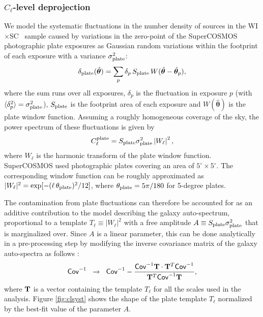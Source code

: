 \documentclass[useAMS,usenatbib]{mn2e}
\newcommand{\nv}{\hat{\boldsymbol{\theta}}}
\newcommand{\wisc}{WI$\times$SC}
\begin{document}
    \subsubsection{$C_\ell$-level deprojection}\label{sssec:methods.syst.plates}
      We model the systematic fluctuations in the number density of sources in the \wisc~ sample caused by variations in the zero-point of the SuperCOSMOS photographic plate exposures as Gaussian random variations within the footprint of each exposure with a variance $\sigma^2_{\rm plate}$:
      \begin{equation}
        \delta_{\rm plate}(\nv) = \sum_p \delta_p\,S_{\rm plate}\,W(\nv-\nv_p),
      \end{equation}
      where the sum runs over all exposures, $\delta_p$ is the fluctuation in exposure $p$ (with $\langle\delta_p^2\rangle=\sigma^2_{\rm plate}$), $S_{\rm plate}$ is the footprint area of each exposure and $W(\nv)$ is the plate window function. Assuming a roughly homogeneous coverage of the sky, the power spectrum of these fluctuations is given by
      \begin{equation}
        C_\ell^{\rm plate}=S_{\rm plate}\sigma_{\rm plate}^2\left|W_\ell\right|^2,
      \end{equation}
      where $W_\ell$ is the harmonic transform of the plate window function. SuperCOSMOS used photographic plates covering an area of $5^\circ\times5^\circ$. The corresponding window function can be roughly approximated as $|W_\ell|^2=\exp[-(\ell\,\theta_{\rm plate})^2/12]$, where $\theta_{\rm plate}=5\pi/180$ for 5-degree plates.
      
      The contamination from plate fluctuations can therefore be accounted for as an additive contribution to the model describing the galaxy auto-spectrum, proportional to a template $T_\ell\equiv|W_\ell|^2$ with a free amplitude $A\equiv S_{\rm plate}\sigma_{\rm plate}^2$ that is marginalized over. Since $A$ is a linear parameter, this can be done analytically in a pre-processing step by modifying the inverse covariance matrix of the galaxy auto-spectra as follows \citep{1992ApJ...398..169R}:
      \begin{equation}
        {\sf Cov}^{-1}\hspace{6pt}\rightarrow\hspace{6pt} {\sf Cov}^{-1}-\frac{{\sf Cov}^{-1}{\bf T}\cdot{\bf T}^T{\sf Cov}^{-1}}{{\bf T}^T{\sf Cov}^{-1}{\bf T}},
      \end{equation}
      where ${\bf T}$ is a vector containing the template $T_\ell$ for all the scales used in the analysis. Figure \ref{fig:clsyst} shows the shape of the plate template $T_\ell$ normalized by the best-fit value of the parameter $A$.
\end{document}
